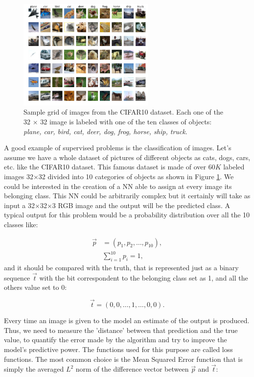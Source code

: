 \begin{figure}
    \centering
    \includegraphics[width = 0.6\textwidth]{images/cifar10}
    \caption{Sample grid of images from the CIFAR10 dataset. Each one of the 32 $\times$ 32 image is labeled with one of the ten classes of objects: \textit{plane, car, bird, cat, deer, dog, frog, horse, ship, truck}.}
    \label{fig:cf10}
\end{figure}

A good example of supervised problems is the classification of images. Let's assume we have a whole dataset of pictures of different objects as cats, dogs, cars, etc. like the CIFAR10 \cite{cifar10} dataset. This famous dataset is made of over 60$K$ labeled images 32$\times$32 divided into 10 categories of objects as shown in Figure \ref{fig:cf10}. We could be interested in the creation of a NN able to assign at every image its belonging class. This NN could be arbitrarily complex but it certainly will take as input a 32$\times$32$\times$3 RGB image and the output will be the predicted class. A typical output for this problem would be a probability distribution over all the 10 classes like:

\begin{align}
    \vec p & = (p_1, p_2, \dots, p_{10}), \\
    &\sum_{i=1}^{10} p_i = 1,
\end{align}
and it should be compared with the truth, that is represented just as a binary sequence $\vec t$ with the bit correspondent to the belonging class set as 1, and all the others value set to 0:

\begin{equation}
    \vec t = (0,0,\dots, 1, \dots,0,0).
\end{equation}

Every time an image is given to the model an estimate of the output is produced. Thus, we need to measure the 'distance' between that prediction and the true value, to quantify the error made by the algorithm and try to improve the model's predictive power. The functions used for this purpose are called loss functions. The most common choice is the Mean Squared Error function that is simply the averaged $L^2$ norm of the difference vector between $\vec p$ and $\vec t$:

